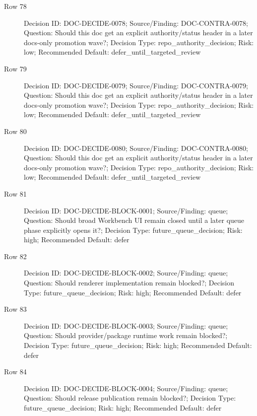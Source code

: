 \documentclass[9pt,a4paper,openany]{book}
\begin{document}
\begin{description}
\item[Row 78] Decision ID: DOC-\allowbreak{}DECIDE-\allowbreak{}0078; Source/\allowbreak{}Finding: DOC-\allowbreak{}CONTRA-\allowbreak{}0078; Question: Should this doc get an explicit authority/\allowbreak{}status header in a later docs-\allowbreak{}only promotion wave?; Decision Type: repo\_\allowbreak{}authority\_\allowbreak{}decision; Risk: low; Recommended Default: defer\_\allowbreak{}until\_\allowbreak{}targeted\_\allowbreak{}review
\item[Row 79] Decision ID: DOC-\allowbreak{}DECIDE-\allowbreak{}0079; Source/\allowbreak{}Finding: DOC-\allowbreak{}CONTRA-\allowbreak{}0079; Question: Should this doc get an explicit authority/\allowbreak{}status header in a later docs-\allowbreak{}only promotion wave?; Decision Type: repo\_\allowbreak{}authority\_\allowbreak{}decision; Risk: low; Recommended Default: defer\_\allowbreak{}until\_\allowbreak{}targeted\_\allowbreak{}review
\item[Row 80] Decision ID: DOC-\allowbreak{}DECIDE-\allowbreak{}0080; Source/\allowbreak{}Finding: DOC-\allowbreak{}CONTRA-\allowbreak{}0080; Question: Should this doc get an explicit authority/\allowbreak{}status header in a later docs-\allowbreak{}only promotion wave?; Decision Type: repo\_\allowbreak{}authority\_\allowbreak{}decision; Risk: low; Recommended Default: defer\_\allowbreak{}until\_\allowbreak{}targeted\_\allowbreak{}review
\item[Row 81] Decision ID: DOC-\allowbreak{}DECIDE-\allowbreak{}BLOCK-\allowbreak{}0001; Source/\allowbreak{}Finding: queue; Question: Should broad Workbench UI remain closed until a later queue phase explicitly opens it?; Decision Type: future\_\allowbreak{}queue\_\allowbreak{}decision; Risk: high; Recommended Default: defer
\item[Row 82] Decision ID: DOC-\allowbreak{}DECIDE-\allowbreak{}BLOCK-\allowbreak{}0002; Source/\allowbreak{}Finding: queue; Question: Should renderer implementation remain blocked?; Decision Type: future\_\allowbreak{}queue\_\allowbreak{}decision; Risk: high; Recommended Default: defer
\item[Row 83] Decision ID: DOC-\allowbreak{}DECIDE-\allowbreak{}BLOCK-\allowbreak{}0003; Source/\allowbreak{}Finding: queue; Question: Should provider/\allowbreak{}package runtime work remain blocked?; Decision Type: future\_\allowbreak{}queue\_\allowbreak{}decision; Risk: high; Recommended Default: defer
\item[Row 84] Decision ID: DOC-\allowbreak{}DECIDE-\allowbreak{}BLOCK-\allowbreak{}0004; Source/\allowbreak{}Finding: queue; Question: Should release publication remain blocked?; Decision Type: future\_\allowbreak{}queue\_\allowbreak{}decision; Risk: high; Recommended Default: defer
\end{description}
\end{document}
